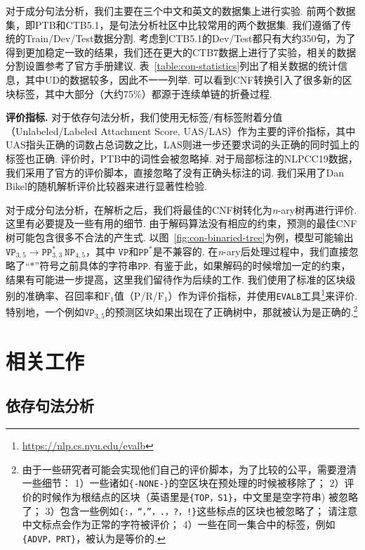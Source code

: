 对于成分句法分析，我们主要在三个中文和英文的数据集上进行实验.
前两个数据集，即PTB和CTB5.1，是句法分析社区中比较常用的两个数据集.
我们遵循了传统的Train/Dev/Test数据分割.
考虑到CTB5.1的Dev/Test都只有大约350句，为了得到更加稳定一致的结果，我们还在更大的CTB7数据上进行了实验，相关的数据分割设置参考了官方手册建议.
表~\ref{table:con-statistics}列出了相关数据的统计信息，其中UD的数据较多，因此不一一列举.
可以看到CNF转换引入了很多新的区块标签，其中大部分（大约75\%）都源于连续单链的折叠过程.



\noindent\textbf{评价指标.}
对于依存句法分析，我们使用无标签/有标签附着分值（Unlabeled/Labeled Attachment Score, UAS/LAS）作为主要的评价指标，其中UAS指头正确的词数占总词数之比，LAS则进一步还要求词的头正确的同时弧上的标签也正确.
评价时，PTB中的词性会被忽略掉.
对于局部标注的NLPCC19数据，我们采用了官方的评价脚本，直接忽略了没有正确头标注的词.
我们采用了Dan Bikel的随机解析评价比较器来进行显著性检验.

对于成分句法分析，在解析之后，我们将最佳的CNF树转化为\textit{n}-ary树再进行评价.
这里有必要提及一些有用的细节.
由于解码算法没有相应的约束，预测的最佳CNF树可能包含很多不合法的产生式.
以图~\ref{fig:con-binaried-tree}为例，模型可能输出$\texttt{VP}_{3,5} \rightarrow \texttt{PP}^{\ast}_{3,3} ~ \texttt{NP}_{4,5}$，其中 $\texttt{VP}$和$\texttt{PP}^{\ast}$是不兼容的.
在\textit{n}-ary后处理过程中，我们直接忽略了``$\mathtt{\ast}$''符号之前具体的字符串$\texttt{PP}$.
有鉴于此，如果解码的时候增加一定的约束，结果有可能进一步提高，这里我们留待作为后续的工作.
我们使用了标准的区块级别的准确率、召回率和$\mathrm{F}_1$值（$\mathrm{P}$/$\mathrm{R}$/$\mathrm{F}_1$）作为评价指标，并使用\texttt{EVALB}工具\footnote{\url{https://nlp.cs.nyu.edu/evalb}}来评价.
特别地，一个例如$\texttt{VP}_{3,5}$的预测区块如果出现在了正确树中，那就被认为是正确的.\footnote{
	由于一些研究者可能会实现他们自己的评价脚本，为了比较的公平，需要澄清一些细节：
	1）一些诸如\texttt{\{-NONE-\}}的空区块在预处理的时候被移除了；
	2）评价的时候作为根结点的区块（英语里是\texttt{\{TOP，S1\}}，中文里是空字符串) 被忽略了；
	3）包含一些例如\texttt{\{:，``，''，.，?，!\}}这些标点的区块也被忽略了；
	请注意中文标点会作为正常的字符被评价；
	4）一些在同一集合中的标签，例如\texttt{\{ADVP，PRT\}}，被认为是等价的.}

\section{相关工作}
\label{sec:relworks}

\subsection{依存句法分析}

